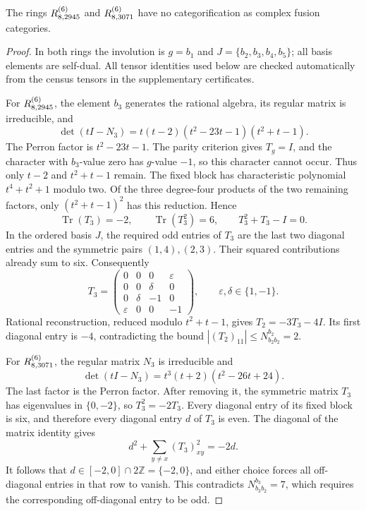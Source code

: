\begin{proposition}\label{prop:two-four-fixed-exclusions}
The rings $R^{(6)}_{8,2945}$ and $R^{(6)}_{8,3071}$ have no categorification
as complex fusion categories.
\end{proposition}
\begin{proof}
In both rings the involution is $g=b_1$ and
$J=\{b_2,b_3,b_4,b_5\}$; all basis elements are self-dual.
All tensor identities used below are checked automatically from the
census tensors in the supplementary certificates.

For $R^{(6)}_{8,2945}$, the element $b_3$ generates the rational algebra,
its regular matrix is irreducible, and
\[
 \det(tI-N_3)=t(t-2)(t^2-23t-1)(t^2+t-1).
\]
The Perron factor is $t^2-23t-1$. The parity criterion gives $T_g=I$,
and the character with $b_3$-value zero has $g$-value $-1$, so this
character cannot occur. Thus only $t-2$ and $t^2+t-1$ remain.
The fixed block has characteristic polynomial
$t^4+t^2+1$ modulo two. Of the three degree-four products of the two
remaining factors, only $(t^2+t-1)^2$ has this reduction. Hence
\[
 \operatorname{Tr}(T_3)=-2,\qquad
 \operatorname{Tr}(T_3^2)=6,\qquad T_3^2+T_3-I=0.
\]
In the ordered basis $J$, the required odd entries of $T_3$ are the
last two diagonal entries and the symmetric pairs $(1,4),(2,3)$.
Their squared contributions already sum to six. Consequently
\[
 T_3=\begin{pmatrix}
 0&0&0&\varepsilon\\
 0&0&\delta&0\\
 0&\delta&-1&0\\
 \varepsilon&0&0&-1
 \end{pmatrix},\qquad \varepsilon,\delta\in\{1,-1\}.
\]
Rational reconstruction, reduced modulo $t^2+t-1$, gives
$T_2=-3T_3-4I$. Its first diagonal entry is $-4$, contradicting the
bound $|(T_2)_{11}|\leq N_{b_2b_2}^{b_2}=2$.

For $R^{(6)}_{8,3071}$, the regular matrix $N_3$ is irreducible and
\[
 \det(tI-N_3)=t^3(t+2)(t^2-26t+24).
\]
The last factor is the Perron factor. After removing it, the symmetric
matrix $T_3$ has eigenvalues in $\{0,-2\}$, so $T_3^2=-2T_3$.
Every diagonal entry of its fixed block is six, and therefore every
diagonal entry $d$ of $T_3$ is even. The diagonal of the matrix identity
gives
\[
 d^2+\sum_{y\ne x}(T_3)_{xy}^2=-2d.
\]
It follows that $d\in[-2,0]\cap2\mathbb Z=\{-2,0\}$, and either
choice forces all off-diagonal entries in that row to vanish. This
contradicts $N_{b_3b_2}^{b_3}=7$, which requires the corresponding
off-diagonal entry to be odd.
\end{proof}

